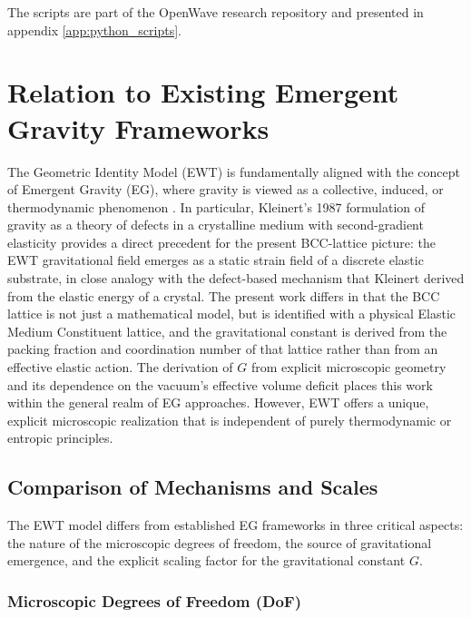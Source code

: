 \documentclass[10pt,a4paper]{article}
\begin{document}
The scripts are part of the OpenWave research repository
\cite{OpenWaveM4Force} and presented in appendix \ref{app:python_scripts}.

\section{Relation to Existing Emergent Gravity Frameworks}
\label{sec:emergent_comparison}

The Geometric Identity Model (EWT) is fundamentally aligned with the concept of Emergent Gravity (EG), where gravity is viewed as a collective, induced, or thermodynamic phenomenon \cite{jacobson1995, verlinde2011, sakharov1968}. In particular, Kleinert's 1987 formulation of gravity as a theory of defects in a crystalline medium with second-gradient elasticity \cite{Kleinert1987} provides a direct precedent for the present BCC-lattice picture: the EWT gravitational field emerges as a static strain field of a discrete elastic substrate, in close analogy with the defect-based mechanism that Kleinert derived from the elastic energy of a crystal. The present work differs in that the BCC lattice is not just a mathematical model, but is identified with a physical Elastic Medium Constituent lattice, and the gravitational constant is derived from the packing fraction and coordination number of that lattice rather than from an effective elastic action. The derivation of $G$ from explicit microscopic geometry and its dependence on the vacuum's effective volume deficit places this work within the general realm of EG approaches. However, EWT offers a unique, explicit microscopic realization that is independent of purely thermodynamic or entropic principles.

\subsection{Comparison of Mechanisms and Scales}
\label{sec:comparison_points}

The EWT model differs from established EG frameworks in three critical aspects: the nature of the microscopic degrees of freedom, the source of gravitational emergence, and the explicit scaling factor for the gravitational constant $G$.

\subsubsection{Microscopic Degrees of Freedom (DoF)}
\end{document}
